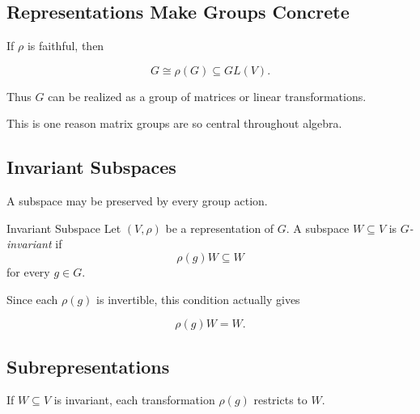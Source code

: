 \subsection{Representations Make Groups Concrete}
\label{subsec:representations-concrete}

If \(\rho\) is faithful, then

\[ G\cong\rho(G)\subseteq GL(V). \]

Thus \(G\) can be realized as a group of matrices or linear transformations.

This is one reason matrix groups are so central throughout algebra.

\begin{center}
\end{center}

\subsection{Invariant Subspaces}
\label{subsec:invariant-subspaces-representations}

A subspace may be preserved by every group action.

\begin{definitionbox}{Invariant Subspace}
Let \((V,\rho)\) be a representation of \(G\). A subspace \(W\subseteq V\)
is \emph{\(G\)-invariant} if
\[ \rho(g)W\subseteq W \]
for every \(g\in G\).
\end{definitionbox}

Since each \(\rho(g)\) is invertible, this condition actually gives

\[ \rho(g)W=W. \]

\subsection{Subrepresentations}
\label{subsec:subrepresentations}

If \(W\subseteq V\) is invariant, each transformation \(\rho(g)\) restricts
to \(W\).

